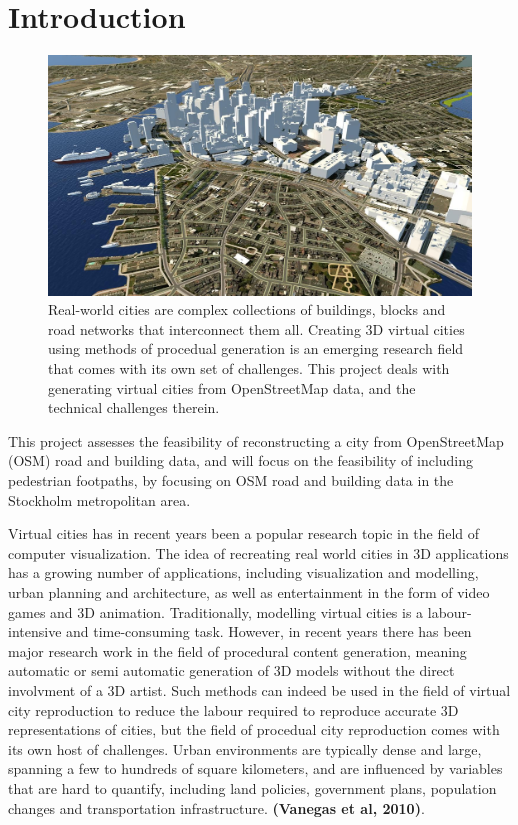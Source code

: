 \documentclass{kththesis}
\begin{document}
\tableofcontents

\mainmatter

\chapter{Introduction}

\begin{figure}[H]
    \centering
    \includegraphics[width=\textwidth,height=0.5\textheight,keepaspectratio]{img_virtual_city}
    \caption{Real-world cities are complex collections of buildings, blocks and road networks that interconnect them all. Creating 3D virtual cities using methods of procedual generation is an emerging research field that comes with its own set of challenges. This project deals with generating virtual cities from OpenStreetMap data, and the technical challenges therein.}
    \label{fig:virtual-city}
\end{figure}

This project assesses the feasibility of reconstructing a city from OpenStreetMap (OSM) road and building data, and will focus on the feasibility of including pedestrian footpaths, by focusing on OSM road and building data in the Stockholm metropolitan area.

Virtual cities has in recent years been a popular research topic in the field of computer visualization.
The idea of recreating real world cities in 3D applications has a growing number of applications, including visualization and modelling, urban planning and architecture, as well as entertainment in the form of video games and 3D animation.
Traditionally, modelling virtual cities is a labour-intensive and time-consuming task.
However, in recent years there has been major research work in the field of procedural content generation, meaning automatic or semi automatic generation of 3D models without the direct involvment of a 3D artist.
Such methods can indeed be used in the field of virtual city reproduction to reduce the labour required to reproduce accurate 3D representations of cities, but the field of procedual city reproduction comes with its own host of challenges.
Urban environments are typically dense and large, spanning a few to hundreds of square kilometers, and are influenced by variables that are hard to quantify, including land policies, government plans, population changes and transportation infrastructure.
\textbf{(Vanegas et al, 2010)}.
\end{document}

